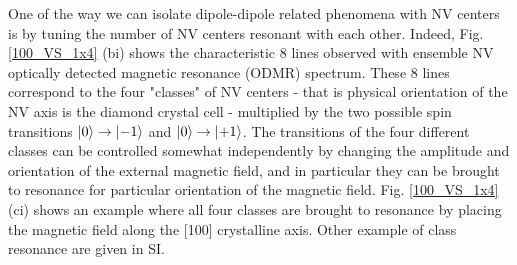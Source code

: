 \documentclass[preprintnumbers,amsmath,amssymb,superscriptaddress,twocolumn,showpacs]{revtex4-2}
\begin{document}
%



One of the way we can isolate dipole-dipole related phenomena with NV centers is by tuning the number of NV centers resonant with each other. Indeed, Fig. \ref{100_VS_1x4} (bi) shows the characteristic 8 lines observed with ensemble NV optically detected magnetic resonance (ODMR) spectrum. These 8 lines correspond to the four "classes" of NV centers - that is physical orientation of the NV axis is the diamond crystal cell - multiplied by the two possible spin transitions $\ket{0}\to\ket{-1}$ and $\ket{0}\to\ket{+1}$. The transitions of the four different classes can be controlled somewhat independently by changing the amplitude and orientation of the external magnetic field, and in particular they can be brought to resonance for particular orientation of the magnetic field. Fig. \ref{100_VS_1x4} (ci) shows an example where all four classes are brought to resonance by placing the magnetic field along the [100] crystalline axis. Other example of class resonance are given in SI.
\end{document}
